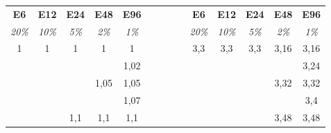 \renewcommand{\arraystretch}{0.65}
\begin{table}[H]
\footnotesize
\centering
\begin{tabular}{|c|c|c|c|c|c|c|c|c|c|c|}
\cline{1-5} \cline{7-11}
{\textbf{E6}}                   & {\textbf{E12}}   & {\textbf{E24}}   & {\textbf{E48}}    & {\textbf{E96}} & $\quad\quad\quad$ & {\textbf{E6}}                  & {\textbf{E12}}    & {\textbf{E24}}   & {\textbf{E48}}    & {\textbf{E96}} \\ \cline{1-5} \cline{7-11} 
\multicolumn{1}{|c|}{\textit{20\%}} & \textit{10\%}        & \textit{5\%}         & \textit{2\%}          & \textit{1\%}       &         & \multicolumn{1}{c|}{\textit{20\%}} & \textit{10\%}         & \textit{5\%}         & \textit{2\%}          & \textit{1\%}       \\ \cline{1-5} \cline{7-11} 
\multirow{16}{*}{1}                 & \multirow{8}{*}{1}   & \multirow{4}{*}{1}   & \multirow{2}{*}{1}    & 1                  &         & \multirow{18}{*}{3,3}              & \multirow{10}{*}{3,3} & \multirow{6}{*}{3,3} & \multirow{2}{*}{3,16} & 3,16               \\ \cline{5-5} \cline{11-11} 
                                    &                      &                      &                       & 1,02               &         &                                    &                       &                      &                       & 3,24               \\ \cline{4-5} \cline{10-11} 
                                    &                      &                      & \multirow{2}{*}{1,05} & 1,05               &         &                                    &                       &                      & \multirow{2}{*}{3,32} & 3,32               \\ \cline{5-5} \cline{11-11} 
                                    &                      &                      &                       & 1,07               &         &                                    &                       &                      &                       & 3,4                \\ \cline{3-5} \cline{10-11} 
                                    &                      & \multirow{4}{*}{1,1} & \multirow{2}{*}{1,1}  & 1,1                &         &                                    &                       &                      & \multirow{2}{*}{3,48} & 3,48               \\ \cline{5-5} \cline{11-11} 

\end{tabular}
\end{table}
